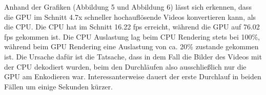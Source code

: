 Anhand der Grafiken (Abbildung 5 und Abbildung 6) lässt sich erkennen, dass die GPU im Schnitt 4.7x schneller hochauflösende Videos konvertieren kann, als die CPU. Die CPU hat im Schnitt 16.22 fps erreicht, während die GPU auf 76.02 fps gekommen ist. Die CPU Auslastung lag beim CPU Rendering stets bei 100\%, während beim GPU Rendering eine Auslastung von ca. 20\% zustande gekommen ist. Die Ursache dafür ist die Tatsache, dass in dem Fall die Bilder des Videos mit der CPU dekodiert wurden, beim den Durchläufen also ausschließlich nur die GPU am Enkodieren war.
Interessanterweise dauert der erste Durchlauf in beiden Fällen um einige Sekunden kürzer.